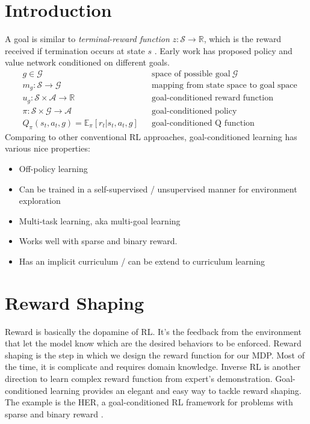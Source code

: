 \section{Introduction}
A goal is similar to \textit{terminal-reward function} $ z: \mathcal{S} \rightarrow \mathbb{R} $, which is the reward received if termination occurs at state $s$ \cite{sutton2011horde}. Early work has proposed policy and value network conditioned on different goals. \cite{schaul2015universal}
\begin{align}
	&g \in \mathcal{G} && \text{space of possible goal}\ \mathcal{G}\\
	&m_g: \mathcal{S} \rightarrow \mathcal{G} && \text{mapping from state space to goal space}\\
	&u_{g}: \mathcal{S} \times \mathcal{A} \rightarrow \mathbb{R} && \text{goal-conditioned reward function}\\
	&\pi: \mathcal{S} \times \mathcal{G} \rightarrow \mathcal{A} && \text{goal-conditioned policy}\\
	&Q_{\pi}(s_t, a_t, g) = \mathbb{E}_{\pi}[r_t | s_t, a_t, g] && \text{goal-conditioned Q function}
\end{align}
Comparing to other conventional \ac{RL} approaches, goal-conditioned learning has various nice properties:
\begin{itemize}
	\item Off-policy learning
	\item Can be trained in a self-supervised / unsupervised manner for environment exploration
	\item Multi-task learning, \ac{aka} multi-goal learning
	\item Works well with sparse and binary reward.
	\item Has an implicit curriculum / can be extend to curriculum learning
\end{itemize}

\section{Reward Shaping}
Reward is basically the dopamine of \ac{RL}. It's the feedback from the environment that let the model know which are the desired behaviors to be enforced. Reward shaping is the step in which we design the reward function for our \ac{MDP}. Most of the time, it is complicate and requires domain knowledge. Inverse \ac{RL} is another direction to learn complex reward function from expert's demonstration. Goal-conditioned learning provides an elegant and easy way to tackle reward shaping. The example is the 
\ac{HER}, a goal-conditioned \ac{RL} framework for problems with sparse and binary reward \cite{andrychowicz2017hindsight}.


